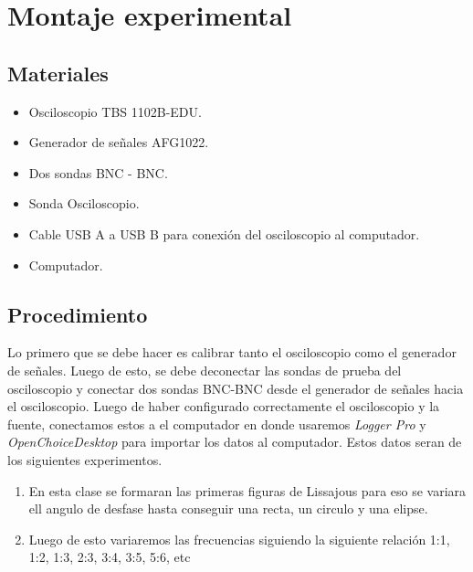 \documentclass[a4paper, amsfonts, amssymb, amsmath, reprint, showkeys, nofootinbib, twoside]{revtex4-1}
\begin{document}
\section{Montaje experimental}

\subsection{Materiales}
\begin{itemize}
    \item Osciloscopio TBS 1102B-EDU.
    \item Generador de señales AFG1022.
    \item Dos sondas BNC - BNC.
    \item Sonda Osciloscopio.
    \item Cable USB A a USB B para conexión del osciloscopio al computador.
    \item Computador.
\end{itemize}
\subsection{Procedimiento}

Lo primero que se debe hacer es calibrar tanto el osciloscopio como el generador de señales. Luego de esto, se debe deconectar las sondas de prueba del osciloscopio y conectar dos sondas BNC-BNC desde el generador de señales hacia el osciloscopio. Luego de haber configurado correctamente el osciloscopio y la fuente, conectamos estos a el computador en donde usaremos \textit{Logger Pro} y \textit{OpenChoiceDesktop} para importar los datos al computador. Estos datos seran de los siguientes experimentos.\cite{Guia}
\begin{enumerate}
    \item En esta clase se formaran las primeras figuras de Lissajous para eso se variara ell angulo de desfase hasta conseguir una recta, un circulo y una elipse.
    \item Luego de esto variaremos las frecuencias siguiendo la siguiente relación 1:1, 1:2, 1:3, 2:3, 3:4, 3:5, 5:6, etc
\end{enumerate}
\end{document}
